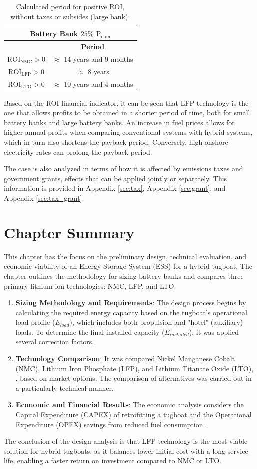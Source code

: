 \begin{table}[H]
	\centering
	\caption{Calculated period for positive ROI, without taxes or subsides (large bank).}
	\label{tab:roi2}
	\begin{tabular}{|c|c|}
		\hline
		\multicolumn{2}{|c|}{Battery Bank $25\%$ ${\text{P}}_{\text{nom}}$} \\
		\hline\hline
		    & \textbf{Period}\\
		 \hline
	${\text{ROI}}_{\text{NMC}}>0$ & $\approx$ 14 years and 9 months \\
		 \hline
	${\text{ROI}}_{\text{LFP}}>0$ & $\approx$ 8 years \\
		 \hline
 	${\text{ROI}}_{\text{LTO}}>0$ & $\approx$ 10 years and 4 months\\
		 \hline
	\end{tabular}
\end{table}

Based on the ROI financial indicator, it can be seen that LFP technology is the one that allows profits to be obtained in a shorter period of time, both for small battery banks and large battery banks. 
An increase in fuel prices allows for higher annual profits when comparing conventional systems with hybrid systems, which in turn also shortens the payback period. Conversely, high onshore electricity rates can prolong the payback period. 

The case is also analyzed in terms of how it is affected by emissions taxes and government grants, effects that can be applied jointly or separately. This information is provided in Appendix \ref{sec:tax}, Appendix \ref{sec:grant}, and Appendix \ref{sec:tax_grant}. 

\section{Chapter Summary}

This chapter has the focus on the preliminary design, technical evaluation, and economic viability of an Energy Storage System (ESS) for a hybrid tugboat. The chapter outlines the methodology for sizing battery banks and compares three primary lithium-ion technologies: NMC, LFP, and LTO.

\begin{enumerate}
\item \textbf{Sizing Methodology and Requirements}: The design process begins by calculating the required energy capacity based on the tugboat's operational load profile ($E_{load}$), which includes both propulsion and "hotel" (auxiliary) loads. To determine the final installed capacity ($E_{installed}$), it was applied several correction factors.
\item \textbf{Technology Comparison}: It was compared Nickel Manganese Cobalt (NMC), Lithium Iron Phosphate (LFP), and Lithium Titanate Oxide (LTO), , based on market options. The comparison of alternatives was carried out in a particularly technical manner. 
\item \textbf{Economic and Financial Results}: The economic analysis considers the Capital Expenditure (CAPEX) of retrofitting a tugboat and the Operational Expenditure (OPEX) savings from reduced fuel consumption.
\end{enumerate}

The conclusion of the design analysis is that LFP technology is the most viable solution for hybrid tugboats, as it balances lower initial cost with a long service life, enabling a faster return on investment compared to NMC or LTO.